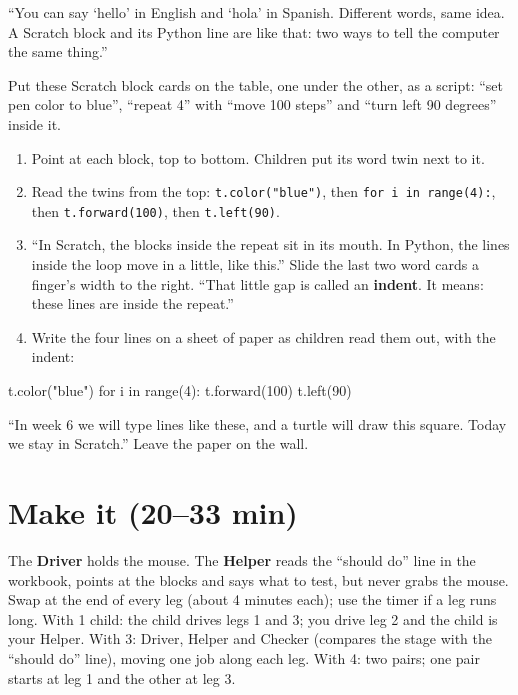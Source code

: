 \begin{analogy}
\enquote{You can say \enquote{hello} in English and \enquote{hola} in Spanish. Different words, same idea. A Scratch block and its Python line are like that: two ways to tell the computer the same thing.}
\end{analogy}

\begin{workedexample}
Put these Scratch block cards on the table, one under the other, as a script: \enquote{set pen color to blue}, \enquote{repeat 4} with \enquote{move 100 steps} and \enquote{turn left 90 degrees} inside it.
\begin{center}
\begin{scratch}[scale=0.85]
\end{scratch}
\end{center}
\begin{enumerate}[leftmargin=1.4em,itemsep=1pt]
  \item Point at each block, top to bottom. Children put its word twin next to it.
  \item Read the twins from the top: \texttt{t.color("blue")}, then \texttt{for i in range(4):}, then \texttt{t.forward(100)}, then \texttt{t.left(90)}.
  \item \enquote{In Scratch, the blocks inside the repeat sit in its mouth. In Python, the lines inside the loop move in a little, like this.} Slide the last two word cards a finger's width to the right. \enquote{That little gap is called an \textbf{indent}. It means: these lines are inside the repeat.}
  \item Write the four lines on a sheet of paper as children read them out, with the indent:
\end{enumerate}
\begin{pycode}
t.color("blue")
for i in range(4):
    t.forward(100)
    t.left(90)
\end{pycode}
\enquote{In week 6 we will type lines like these, and a turtle will draw this square. Today we stay in Scratch.} Leave the paper on the wall.
\end{workedexample}

\section{Make it (20--33 min)}
\begin{pairroles}
The \textbf{Driver} holds the mouse. The \textbf{Helper} reads the \enquote{should do} line in the workbook, points at the blocks and says what to test, but never grabs the mouse. Swap at the end of every leg (about 4 minutes each); use the timer if a leg runs long. With 1 child: the child drives legs 1 and 3; you drive leg 2 and the child is your Helper. With 3: Driver, Helper and Checker (compares the stage with the \enquote{should do} line), moving one job along each leg. With 4: two pairs; one pair starts at leg 1 and the other at leg 3.
\end{pairroles}

